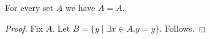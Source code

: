 \begin{proposition}\label{phase5_relational_local_failure}
    For every set $A$ we have $A = A$.
\end{proposition}
\begin{proof}
    Fix $A$.
    Let $B = \{ y \mid \exists x\in A. y = y \}$.
    Follows.
\end{proof}
